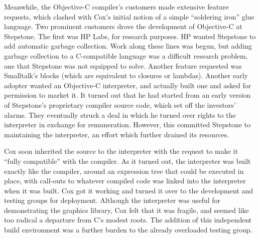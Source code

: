 \documentclass[acmsmall,screen]{acmart}
\begin{document}
Meanwhile, the Objective-C compiler's customers made extensive feature requests, which clashed with Cox's initial notion of a simple ``soldering iron'' glue language. Two prominent customers drove the development of Objective-C at Stepstone. The first was HP Labs, for research purposes. HP wanted Stepstone to add automatic garbage collection. Work along these lines was begun, but adding garbage collection to a C-compatible language was a difficult research problem, one that Stepstone was not equipped to solve. Another feature requested was Smalltalk's blocks (which are equivalent to closures or lambdas). Another early adopter wanted an Objective-C interpreter, and actually built one and asked for permission to market it. It turned out that he had started from an early version of Stepstone's proprietary compiler source code, which set off the investors' alarms. They eventually struck a deal in which he turned over rights to the interpreter in exchange for remuneration. However, this committed Stepstone to maintaining the interpreter, an effort which further drained its resources.

Cox soon inherited the source to the interpreter with the request to make it ``fully compatible'' with the compiler. As it turned out, the interpreter was built exactly like the compiler, around an expression tree that could be executed in place, with call-outs to whatever compiled code was linked into the interpreter when it was built. Cox got it working and turned it over to the development and testing groups for deployment. Although the interpreter was useful for demonstrating the graphics library, Cox felt that it was fragile, and seemed like too radical a departure from C's modest roots. The addition of this independent build environment was a further burden to the already overloaded testing group. 
\end{document}
